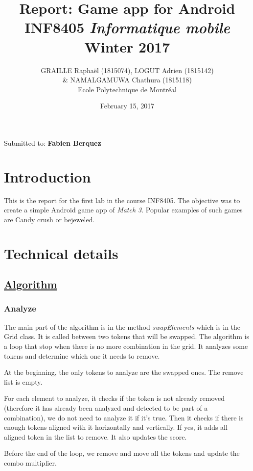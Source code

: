\documentclass{article}
\title{Report: Game app for Android\\ INF8405 \textit{Informatique mobile}\\ Winter 2017 }
\author{GRAILLE Raphaël  (1815074), LOGUT Adrien (1815142) \\ \& NAMALGAMUWA Chathura (1815118)\\ Ecole Polytechnique de Montréal}
\date{February 15, 2017}
\begin{document}
\maketitle

Submitted to: \textbf{Fabien Berquez}
\newpage

\tableofcontents

\newpage

\section{Introduction}

This is the report for the first lab in the course INF8405. The objective was to create a simple Android game app of \textit{Match 3}. Popular examples of such games are Candy crush or bejeweled. 

\section{Technical details}


\subsection{\href{https://www.youtube.com/watch?v=8y6zNR4X8xs&feature=youtu.be&t=4m29s}{Algorithm}}

\subsubsection{Analyze}

The main part of the algorithm is in the method \textit{swapElements} which is in the Grid class. It is called between two tokens that will be swapped. The algorithm is a loop that stop when there is no more combination in the grid. It analyzes some tokens and determine which one it needs to remove.

At the beginning, the only tokens to analyze are the swapped ones. The remove list is empty.

For each element to analyze, it checks if the token is not already removed (therefore it has already been analyzed and detected to be part of a combination), we do not need to analyze it if it's true. Then it checks if there is enough tokens aligned with it horizontally and vertically. If yes, it adds all aligned token in the list to remove. It also updates the score.

Before the end of the loop, we remove and move all the tokens and update the combo multiplier.
\end{document}
